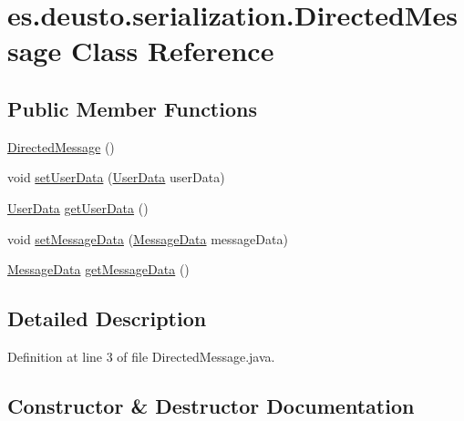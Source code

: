 \hypertarget{classes_1_1deusto_1_1serialization_1_1_directed_message}{}\section{es.\+deusto.\+serialization.\+Directed\+Message Class Reference}
\label{classes_1_1deusto_1_1serialization_1_1_directed_message}
\subsection*{Public Member Functions}
\begin{DoxyCompactItemize}
\item 
\mbox{\hyperlink{classes_1_1deusto_1_1serialization_1_1_directed_message_aa9849ae931af7c774d2e98a15da1a166}{Directed\+Message}} ()
\item 
void \mbox{\hyperlink{classes_1_1deusto_1_1serialization_1_1_directed_message_a4a3f7852410bc29d73179294836e84c4}{set\+User\+Data}} (\mbox{\hyperlink{classes_1_1deusto_1_1serialization_1_1_user_data}{User\+Data}} user\+Data)
\item 
\mbox{\hyperlink{classes_1_1deusto_1_1serialization_1_1_user_data}{User\+Data}} \mbox{\hyperlink{classes_1_1deusto_1_1serialization_1_1_directed_message_a66353c1aa604944db42e4bc569141782}{get\+User\+Data}} ()
\item 
void \mbox{\hyperlink{classes_1_1deusto_1_1serialization_1_1_directed_message_a07d4d35baf35f14f68f710e34a564f8d}{set\+Message\+Data}} (\mbox{\hyperlink{classes_1_1deusto_1_1serialization_1_1_message_data}{Message\+Data}} message\+Data)
\item 
\mbox{\hyperlink{classes_1_1deusto_1_1serialization_1_1_message_data}{Message\+Data}} \mbox{\hyperlink{classes_1_1deusto_1_1serialization_1_1_directed_message_a1090d3ffcdb0d012ab443b87fcdfff8b}{get\+Message\+Data}} ()
\end{DoxyCompactItemize}


\subsection{Detailed Description}


Definition at line 3 of file Directed\+Message.\+java.



\subsection{Constructor \& Destructor Documentation}
\mbox{\label{classes_1_1deusto_1_1serialization_1_1_directed_message_aa9849ae931af7c774d2e98a15da1a166}} 
